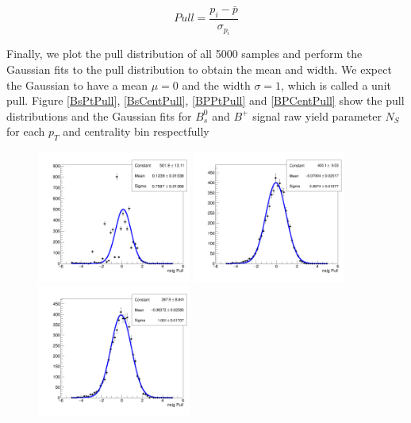 \begin{equation}
Pull = \frac{p_i - \bar p}{\sigma_{p_i}}
\end{equation}

Finally, we plot the pull distribution of all 5000 samples and perform the Gaussian fits to the pull distribution to obtain the mean and width. We expect the Gaussian to have a mean $\mu = 0$ and the width $\sigma = 1$, which is called a unit pull. Figure \ref{BsPtPull}, \ref{BsCentPull}, \ref{BPPtPull} and \ref{BPCentPull} show the pull distributions and the Gaussian fits for $B^0_s$ and $B^+$ signal raw yield parameter $N_S$ for each $p_T$ and centrality bin respectfully 



\begin{figure}[h]
\begin{center}
\includegraphics[width= 0.45\textwidth]{Figures/Chapter5/pull_signal_BptNew_0_90_7_10_0_Bs.png}
\includegraphics[width= 0.45\textwidth]{Figures/Chapter5/pull_signal_BptNew_0_90_10_15_0_Bs.png}
\includegraphics[width= 0.45\textwidth]{Figures/Chapter5/pull_signal_BptNew_0_90_15_20_0_Bs.png}

\end{center}
\end{figure}
